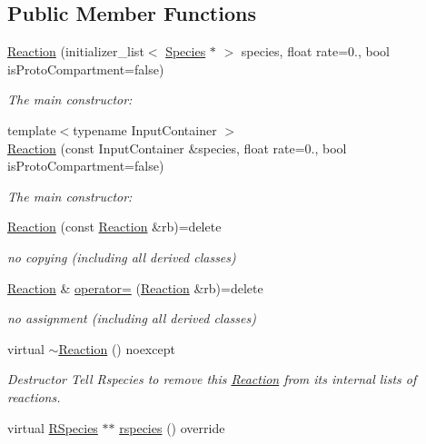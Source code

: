 \subsection*{Public Member Functions}
\begin{DoxyCompactItemize}
\item 
\hyperlink{classReaction_a4203ca852b2b5024b126c0200200004a}{Reaction} (initializer\+\_\+list$<$ \hyperlink{classSpecies}{Species} $\ast$ $>$ species, float rate=0., bool is\+Proto\+Compartment=false)
\begin{DoxyCompactList}\small\item\em The main constructor\+: \end{DoxyCompactList}\item 
{\footnotesize template$<$typename Input\+Container $>$ }\\\hyperlink{classReaction_ad51a40ea6318b81ba03f28b214fa9c6e}{Reaction} (const Input\+Container \&species, float rate=0., bool is\+Proto\+Compartment=false)
\begin{DoxyCompactList}\small\item\em The main constructor\+: \end{DoxyCompactList}\item 
\hyperlink{classReaction_a25d5afed0f7750c2ca3cea5d0d6f5aed}{Reaction} (const \hyperlink{classReaction}{Reaction} \&rb)=delete
\begin{DoxyCompactList}\small\item\em no copying (including all derived classes) \end{DoxyCompactList}\item 
\hyperlink{classReaction}{Reaction} \& \hyperlink{classReaction_a080de6007b340d599614a58d6d15aaf7}{operator=} (\hyperlink{classReaction}{Reaction} \&rb)=delete
\begin{DoxyCompactList}\small\item\em no assignment (including all derived classes) \end{DoxyCompactList}\item 
virtual \hyperlink{classReaction_a03fa84e582707019660770c481a8af4e}{$\sim$\+Reaction} () noexcept
\begin{DoxyCompactList}\small\item\em Destructor Tell Rspecies to remove this \hyperlink{classReaction}{Reaction} from its internal lists of reactions. \end{DoxyCompactList}\item 
virtual \hyperlink{classRSpecies}{R\+Species} $\ast$$\ast$ \hyperlink{classReaction_a5ad798e1a2e3f643f742a47815acfa25}{rspecies} () override
$$
\end{DoxyCompactItemize}

